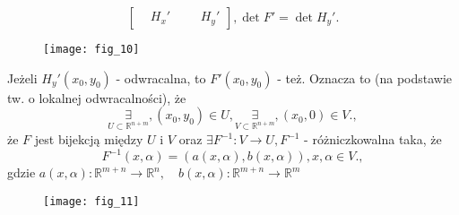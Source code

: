 \documentclass[../main.tex]{subfiles}
\begin{document}
\begin{dowod}
\[\begin{bmatrix}
         &H_x'&&&H_y'
    \end{bmatrix}, \det F' = \det H_y'
    .\]
    \begin{figure}[h]
        \centering
        \texttt{[image: fig\_10]}
        \caption{}
        \label{fig:}
    \end{figure}
    Jeżeli $H_y'(x_0,y_0)$ - odwracalna, to $F'(x_0,y_0)$ - też.
    Oznacza to (na podstawie tw. o lokalnej odwracalności), że
    \[
        \underset{U\subset\mathbb{R}^{n+m}}{\exists},
        (x_0,y_0)\in U, \underset{V\subset\mathbb{R}^{n+m}}{\exists} ,(x_0,0)\in V
    .,\] że $F$ jest bijekcją między $U$ i $V$ oraz $\exists F^{-1}:V\to U, F^{-1}$ - różniczkowalna taka, że
     \[
         F^{-1}(x,\alpha) = (a(x,\alpha),b(x,\alpha)), x,\alpha\in V
     .,\] gdzie $a(x,\alpha): \mathbb{R}^{m+n}\to\mathbb{R}^n,\quad b(x,\alpha):\mathbb{R}^{m+n}\to\mathbb{R}^m  $

\end{dowod}

\begin{figure}[h]
    \centering
    \texttt{[image: fig\_11]}
    \caption{}
    \label{fig:}
\end{figure}
\end{document}
